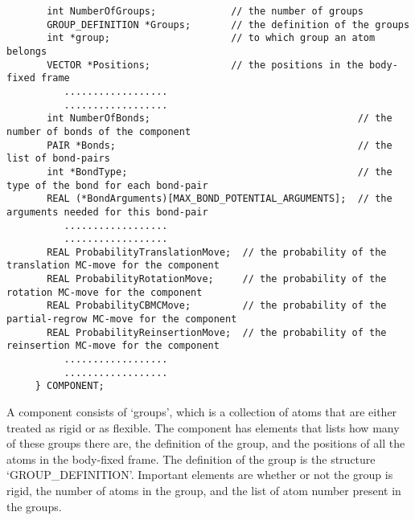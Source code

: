 \begin{footnotesize}
\begin{verbatim}
       int NumberOfGroups;             // the number of groups
       GROUP_DEFINITION *Groups;       // the definition of the groups
       int *group;                     // to which group an atom belongs
       VECTOR *Positions;              // the positions in the body-fixed frame
          ..................
          ..................
       int NumberOfBonds;                                    // the number of bonds of the component
       PAIR *Bonds;                                          // the list of bond-pairs
       int *BondType;                                        // the type of the bond for each bond-pair
       REAL (*BondArguments)[MAX_BOND_POTENTIAL_ARGUMENTS];  // the arguments needed for this bond-pair
          ..................
          ..................
       REAL ProbabilityTranslationMove;  // the probability of the translation MC-move for the component
       REAL ProbabilityRotationMove;     // the probability of the rotation MC-move for the component
       REAL ProbabilityCBMCMove;         // the probability of the partial-regrow MC-move for the component
       REAL ProbabilityReinsertionMove;  // the probability of the reinsertion MC-move for the component
          ..................
          ..................
     } COMPONENT;
\end{verbatim}
\end{footnotesize}

A component consists of `groups', which is a collection of atoms that are either treated as rigid or as flexible. The component has
elements that lists how many of these groups there are, the definition of the group, and the positions of all the atoms in the body-fixed frame.
The definition of the group is the structure `GROUP\_DEFINITION'. Important elements are whether or not the group is rigid, the
number of atoms in the group, and the list of atom number present in the groups.

